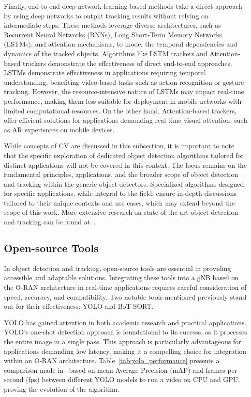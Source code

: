 Finally, end-to-end deep network learning-based methods take a direct approach by using deep networks to output tracking results without relying on intermediate steps.
These methods leverage diverse architectures, such as Recurrent Neural Networks (RNNs), Long Short-Term Memory Networks (LSTMs), and attention mechanisms, to model the temporal dependencies and dynamics of the tracked objects.
Algorithms like LSTM trackers and Attention-based trackers demonstrate the effectiveness of direct end-to-end approaches.
LSTMs demonstrate effectiveness in applications requiring temporal understanding, benefiting video-based tasks such as action recognition or gesture tracking.
However, the resource-intensive nature of LSTMs may impact real-time performance, making them less suitable for deployment in mobile networks with limited computational resources.
On the other hand, Attention-based trackers, offer efficient solutions for applications demanding real-time visual attention, such as AR experiences on mobile devices.

While concepts of CV are discussed in this subsection, it is important to note that the specific exploration of dedicated object detection algorithms tailored for distinct applications will not be covered in this context.
The focus remains on the fundamental principles, applications, and the broader scope of object detection and tracking within the generic object detectors.
Specialized algorithms designed for specific applications, while integral to the field, ensure in-depth discussions tailored to their unique contexts and use cases, which may extend beyond the scope of this work.
More extensive research on state-of-the-art object detection and tracking can be found at~\cite{obj_detec_SOA}.

\subsection{Open-source Tools}\label{subsec:open_tools}
In object detection and tracking, open-source tools are essential in providing accessible and adaptable solutions.
Integrating these tools into a gNB based on the O-RAN architecture in real-time applications requires careful consideration of speed, accuracy, and compatibility.
Two notable tools mentioned previously stand out for their effectiveness: YOLO and BoT-SORT\@.

YOLO\cite{YOLO} has gained attention in both academic research and practical applications.
YOLO's one-shot detection approach is foundational to its success, as it processes the entire image in a single pass.
This approach is particularly advantageous for applications demanding low latency, making it a compelling choice for integration within an O-RAN architecture.
Table~\ref{tab:yolo_performance} presents a comparison made in~\cite{YOLO_compare} based on mean Average Precision (mAP) and frames-per-second (fps) between different YOLO models to run a video on CPU and GPU, proving the evolution of the algorithm.

